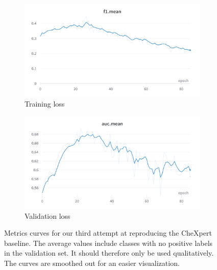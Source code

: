 \documentclass[11pt]{article}
\begin{document}
            \begin{figure}[H]
                 \centering
                 \begin{subfigure}[b]{0.45\textwidth}
                     \centering
                     \includegraphics[width=\textwidth]{plots/chexpert_f1_3}
                     \caption{Training loss}
                     \vspace{4ex}
                     \label{fig:chexpert_f1_3}
                 \end{subfigure}
                 \hfill
                 \begin{subfigure}[b]{0.45\textwidth}
                     \centering
                     \includegraphics[width=\textwidth]{plots/chexpert_auc_3}
                     \caption{Validation loss}
                     \vspace{4ex}
                     \label{fig:chexpert_auc_3}
                 \end{subfigure}
                 \label{fig:chexpert_results3}
                 \caption{Metrics curves for our third attempt at reproducing the CheXpert baseline. The average values
                 include classes with no positive labels in the validation set. It should therefore only be used qualitatively. The curves are smoothed
                 out for an easier visualization.}

            \end{figure}
\end{document}
